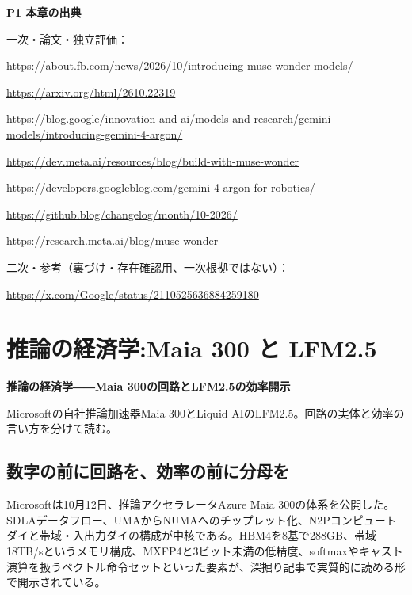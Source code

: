 \documentclass[lualatex,a4paper,10pt]{jlreq}
\begin{document}
\begin{tcolorbox}[colback=white,colframe=SurveyRule,arc=1mm,boxrule=0.4pt,left=2mm,right=2mm]
\textbf{P1 本章の出典}\par\footnotesize
一次・論文・独立評価：\par
[B01] \url{https://about.fb.com/news/2026/10/introducing-muse-wonder-models/}\par
[B02] \url{https://arxiv.org/html/2610.22319}\par
[B03] \url{https://blog.google/innovation-and-ai/models-and-research/gemini-models/introducing-gemini-4-argon/}\par
[B04] \url{https://dev.meta.ai/resources/blog/build-with-muse-wonder}\par
[B05] \url{https://developers.googleblog.com/gemini-4-argon-for-robotics/}\par
[B06] \url{https://github.blog/changelog/month/10-2026/}\par
[B07] \url{https://research.meta.ai/blog/muse-wonder}\par
二次・参考（裏づけ・存在確認用、一次根拠ではない）：\par
[B08] \url{https://x.com/Google/status/2110525636884259180}\par
\end{tcolorbox}

\section{推論の経済学:Maia 300 と LFM2.5}
\label{sec:P2}

{\Large\bfseries 推論の経済学――Maia 300の回路とLFM2.5の効率開示\par}
\smallskip
{\color{SurveyMuted}Microsoftの自社推論加速器Maia 300とLiquid AIのLFM2.5。回路の実体と効率の言い方を分けて読む。\par}
\bigskip

\subsection*{数字の前に回路を、効率の前に分母を}

Microsoftは10月12日、推論アクセラレータAzure Maia 300の体系を公開した。SDLAデータフロー、UMAからNUMAへのチップレット化、N2Pコンピュートダイと帯域・入出力ダイの構成が中核である。HBM4を8基で288GB、帯域18TB/sというメモリ構成、MXFP4と3ビット未満の低精度、softmaxやキャスト演算を扱うベクトル命令セットといった要素が、深掘り記事で実質的に読める形で開示されている。
\cite{B09,B10}
\end{document}
